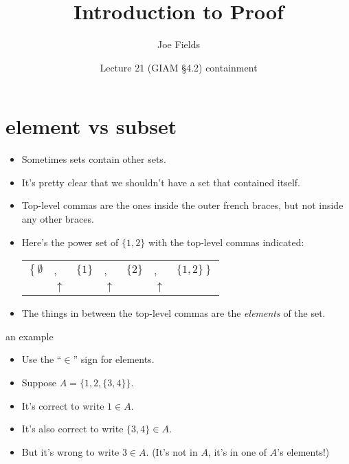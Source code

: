 \documentclass[handout,landscape]{beamer}
\author{Joe Fields}
\title{Introduction to Proof}
\date{Lecture 21 (GIAM \S 4.2) \newline containment}
\institute[SCSU]{ {\tt fieldsj1@southernct.edu} }
\begin{document}
\begin{frame}[plain]
  \titlepage
\end{frame}

\section{element vs subset}

\begin{frame}{}
\begin{itemize}
\item Sometimes sets contain other sets. \pause
\item It's pretty clear that we shouldn't have a set that contained itself.\pause
\item Top-level commas are the ones inside the outer french braces, but not inside any other braces.\pause
\item Here's the power set of $\{1,2\}$ with the top-level commas indicated: \pause

\setlength{\tabcolsep}{0pt}
\begin{tabular}{clclclc}
$\left\{ \emptyset \right.$ & , & $\{1\}$ & , & $\{2\}$ & , & $\left. \{1,2\} \right\}$ \\
 & $\uparrow$ & & $\uparrow$ & & $\uparrow$ & \\
\end{tabular}
\setlength{\tabcolsep}{6pt}
\pause
\item The things in between the top-level commas are the {\em elements} of the set.
\end{itemize}
\end{frame}

\begin{frame}{an example}
\begin{itemize}
\item Use the ``$\in$'' sign for elements. \pause
\item Suppose $A = \{ 1, 2, \{3, 4\}\}$. \pause
\item It's correct to write $1 \in A$. \pause
\item It's also correct to write $\{3, 4\} \in A$. \pause
\item But it's wrong to write $3 \in A$. \pause (It's not in $A$, it's in one of $A$'s elements!) 
\end{itemize}
\end{frame}
\end{document}
